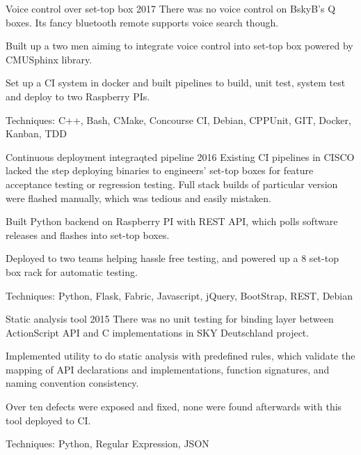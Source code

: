 \begin{cventries}
  \cventryX
    {Voice control over set-top box}
    {2017}
    {There was no voice control on BskyB's Q boxes. Its fancy bluetooth remote supports voice search though.}
    {
      \begin{cvitems}
        \item {Built up a two men aiming to integrate voice control into set-top box powered by CMUSphinx library.}
        \item {Set up a CI system in docker and built pipelines to build, unit test, system test and deploy to two Raspberry PIs.}
        \item{Techniques: C++, Bash, CMake, Concourse CI, Debian, CPPUnit, GIT, Docker, Kanban, TDD}
      \end{cvitems}
    }
  \cventryX
    {Continuous deployment integraqted pipeline}
    {2016}
    {Existing CI pipelines in CISCO lacked the step deploying binaries to engineers' set-top boxes for feature acceptance testing or regression testing. Full stack builds of particular version were flashed manually, which was tedious and easily mistaken.}
    {
      \begin{cvitems}
        \item {Built Python backend on Raspberry PI with REST API, which polls software releases and flashes into set-top boxes.}
        \item {Deployed to two teams helping hassle free testing, and powered up a 8 set-top box rack for automatic testing.}
        \item{Techniques: Python, Flask, Fabric, Javascript, jQuery, BootStrap, REST, Debian}
      \end{cvitems}
    }
  \cventryX
    {Static analysis tool}
    {2015}
    {There was no unit testing for binding layer between ActionScript API and C implementations in SKY Deutschland project.}
    {
      \begin{cvitems}
        \item {Implemented utility to do static analysis with predefined rules, which validate the mapping of API declarations and implementations, function signatures, and naming convention consistency.}
        \item {Over ten defects were exposed and fixed, none were found afterwards with this tool deployed to CI.}
        \item {Techniques: Python, Regular Expression, JSON}
      \end{cvitems}
    }
\end{cventries}

